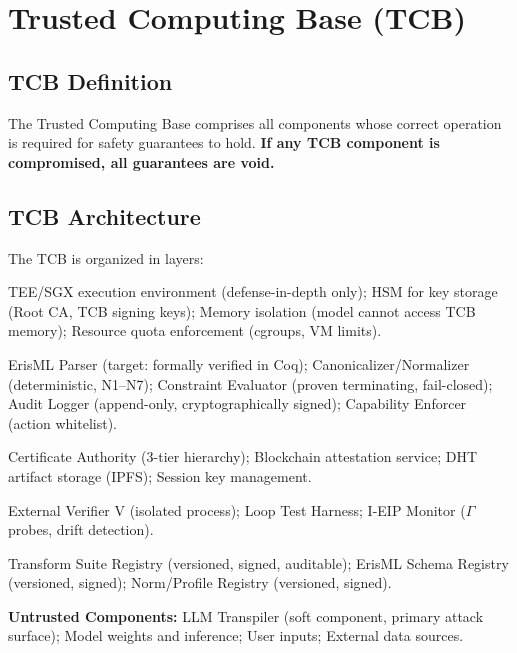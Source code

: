 \documentclass[11pt,letterpaper]{article}
\theoremstyle{definition}
\theoremstyle{remark}
\begin{document}

\section{Trusted Computing Base (TCB)}
\label{sec:tcb}

\subsection{TCB Definition}

The Trusted Computing Base comprises all components whose correct operation is required for safety guarantees to hold. \textbf{If any TCB component is compromised, all guarantees are void.}

\subsection{TCB Architecture}

The TCB is organized in layers:

\begin{description}[style=nextline]
\item[Hardware Layer] TEE/SGX execution environment (defense-in-depth only); HSM for key storage (Root CA, TCB signing keys); Memory isolation (model cannot access TCB memory); Resource quota enforcement (cgroups, VM limits).
\item[Enforcement Layer] ErisML Parser (target: formally verified in Coq); Canonicalizer/Normalizer (deterministic, N1--N7); Constraint Evaluator (proven terminating, fail-closed); Audit Logger (append-only, cryptographically signed); Capability Enforcer (action whitelist).
\item[Cryptographic Layer] Certificate Authority (3-tier hierarchy); Blockchain attestation service; DHT artifact storage (IPFS); Session key management.
\item[Verification Layer] External Verifier V (isolated process); Loop Test Harness; I-EIP Monitor ($\Gamma$ probes, drift detection).
\item[Governance Layer] Transform Suite Registry (versioned, signed, auditable); ErisML Schema Registry (versioned, signed); Norm/Profile Registry (versioned, signed).
\end{description}

\noindent\textbf{Untrusted Components:} LLM Transpiler (soft component, primary attack surface); Model weights and inference; User inputs; External data sources.
\end{document}
